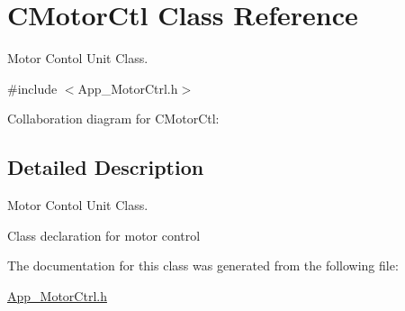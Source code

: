 \hypertarget{class_c_motor_ctl}{}\section{C\+Motor\+Ctl Class Reference}
\label{class_c_motor_ctl}


Motor Contol Unit Class.  




{\ttfamily \#include $<$App\+\_\+\+Motor\+Ctrl.\+h$>$}



Collaboration diagram for C\+Motor\+Ctl\+:


\subsection{Detailed Description}
Motor Contol Unit Class. 

Class declaration for motor control 

The documentation for this class was generated from the following file\+:\begin{DoxyCompactItemize}
\item 
\mbox{\hyperlink{_app___motor_ctrl_8h}{App\+\_\+\+Motor\+Ctrl.\+h}}\end{DoxyCompactItemize}
